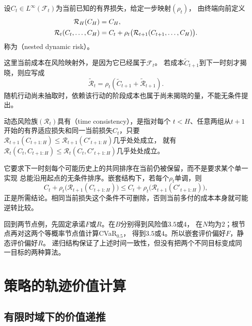 \begin{definition}[嵌套动态风险]
\label{def:decision-nested-dynamic-risk}
设$C_t\in L^\infty(\mathcal F_t)$为当前已知的有界损失，给定一步映射$(\rho_t)$，
由终端向前定义
\begin{align}
  \mathcal R_H(C_H)&=C_H,\notag\\
  \mathcal R_t(C_t,\ldots,C_H)
  &=C_t+\rho_t\bigl(\mathcal R_{t+1}(C_{t+1},\ldots,C_H)\bigr).
  \label{eq:decision-nested-dynamic-risk}
\end{align}
称为（nested dynamic risk）。
\end{definition}
这里当前成本在风险映射外，是因为它已经属于$\mathcal F_t$。
若成本$\widetilde C_{t+1}$到下一时刻才揭晓，则应写成
\[
  \widetilde{\mathcal R}_t
  =\rho_t(\widetilde C_{t+1}+\widetilde{\mathcal R}_{t+1}).
\]
随机行动尚未抽取时，依赖该行动的阶段成本也属于尚未揭晓的量，不能无条件提出。

\begin{definition}[递归意义下的时间一致性]
\label{def:decision-time-consistency}
动态风险族$(\mathcal R_t)$具有（time consistency），是指对每个
$t<H$、任意两组从$t+1$开始的有界适应损失和同一当前损失$C_t$，只要
$\mathcal R_{t+1}(C_{t+1:H})\leq\mathcal R_{t+1}(C'_{t+1:H})$几乎处处成立，
就有$\mathcal R_t(C_t,C_{t+1:H})\leq\mathcal R_t(C_t,C'_{t+1:H})$几乎处处成立。
\end{definition}
它要求下一时刻每个可能历史上的共同排序在当前仍被保留，而不是要求某个单一实现
总能沿用起点的无条件排序。嵌套结构下，若每个$\rho_t$单调，则
\[
  C_t+\rho_t\bigl(\mathcal R_{t+1}(C_{t+1:H})\bigr)
  \leq
  C_t+\rho_t\bigl(\mathcal R_{t+1}(C'_{t+1:H})\bigr),
\]
正是所需结论。相同当前损失这个条件不可删除，否则当前多付的成本本身就可能逆转比较。

回到两节点例，先固定承诺$F$或$R$。在$B$分别得到风险值$3.5$或$4$，
在$N$均为$2$；根节点再对这两个等概率节点值计算CVaR$_{0.5}$，
得到$3.5$或$4$。所以嵌套评价偏好$F$，静态评价偏好$R$。
递归结构保证了上述时间一致性，但没有把两个不同目标变成同一目标的两种算法。

\section{策略的轨迹价值计算}
\label{sec:policy-value-evaluation}

\subsection{有限时域下的价值递推}
\label{sec:policy-finite-evaluation}

